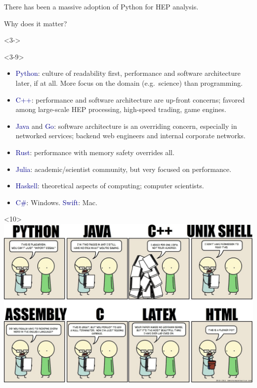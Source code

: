 \documentclass[aspectratio=169]{beamer}
\begin{document}
\begin{frame}{There has been a massive adoption of Python for HEP analysis.}
\large
\vspace{0.35 cm}

{\Large Why does it matter?}

\vspace{0.25 cm}

\vspace{0.25 cm}
\begin{uncoverenv}<3->
\begin{onlyenv}<3-9>
\begin{itemize}\setlength{\itemsep}{0.1 cm}
\item<3-> \textcolor{darkblue}{Python}: culture of readability first, performance and software architecture later, if at all. More focus on the domain (e.g.\ science) than programming.
\item<4-> \textcolor{darkblue}{C++}: performance and software architecture are up-front concerns; favored among large-scale HEP processing, high-speed trading, game engines.
\item<5-> \textcolor{darkblue}{Java} and \textcolor{darkblue}{Go}: software architecture is an overriding concern, especially in networked services; backend web engineers and internal corporate networks.
\item<6-> \textcolor{darkblue}{Rust}: performance with memory safety overrides all.
\item<7-> \textcolor{darkblue}{Julia}: academic/scientist community, but very focused on performance.
\item<8-> \textcolor{darkblue}{Haskell}: theoretical aspects of computing; computer scientists.
\item<9-> \textcolor{darkblue}{C\#}: Windows. \textcolor{darkblue}{Swift}: Mac.
\end{itemize}
\end{onlyenv}\begin{onlyenv}<10>
\mbox{ } \hfill \includegraphics[width=0.63\linewidth]{PLOTS/somethingofthatilk-comic.jpg} \hfill \mbox{ }
\end{onlyenv}
\vspace{8 cm}
\end{uncoverenv}
\end{frame}
\end{document}
